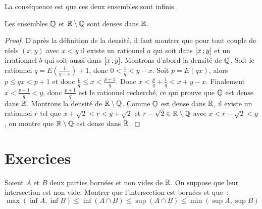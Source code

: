 La conséquence est que ces deux ensembles sont infinis.

\begin{theo}
  Les ensembles \(\mathbb{Q}\) et \(\mathbb{R}\setminus\mathbb{Q}\) sont denses dans \(\mathbb{R}\).
\end{theo}
\begin{proof}
  D'après la définition de la densité, il faut montrer que pour tout couple de réels \((x,y)\) avec \(x<y\) il existe un rationnel \(a\) qui soit dans \(\left[ x \, ;  y \right]\) et un irrationnel \(b\) qui soit aussi dans \(\left[ x \, ;  y \right]\). Montrons d'abord la densité de \(\mathbb{Q}\). Soit le rationnel \(q=E\left(\frac{1}{y-x}\right)+1\), donc \(0<\frac{1}{q}<y-x\). Soit \(p=E(qx)\), alors \(p\leqslant qx<p+1\) et donc \(\frac{p}{q}\leqslant x <\frac{p+1}{q}\). Donc \(x<\frac{p}{q}+\frac{1}{q}<x+y-x\). Finalement \(x<\frac{p+1}{q}<y\), donc \(\frac{p+1}{q}\) est le rationnel recherché, ce qui prouve que \(\mathbb{Q}\) est dense dans \(\mathbb{R}\). Montrons la densité de \(\mathbb{R}\setminus\mathbb{Q}\). Comme \(\mathbb{Q}\) est dense dans \(\mathbb{R}\), il existe un rationnel \(r\) tel que \(x+\sqrt{2}<r<y+\sqrt{2}\) et \(r-\sqrt{2}\in\mathbb{R}\setminus\mathbb{Q}\) avec \(x<r-\sqrt{2}<y\), on montre que  \(\mathbb{R}\setminus\mathbb{Q}\) est dense dans \(\mathbb{R}\).
\end{proof}

\section{Exercices}
\begin{exercice}
    Soient \(A\) et \(B\) deux parties bornées et non vides de \(\mathbb{R}\). On suppose que leur intersection est non vide. Montrer que l'intersection est bornées et que~:
    \[ \max(\inf A, \inf B) \leqslant \inf(A \cap B) \leqslant \sup(A \cap B) \leqslant \min(\sup A, \sup B)\]
\end{exercice}

